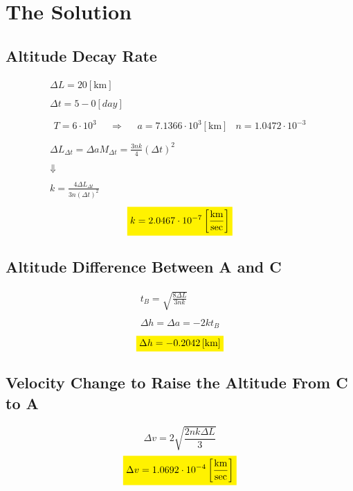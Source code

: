 \documentclass[11pt, a4paper]{article}
\begin{document}
\newpage

\section{The Solution}

\subsection{Altitude Decay Rate}
\begin{equation}
    \begin{array}{c}
        \Delta L=20\left[\mathrm{km}\right] \\\\
        \Delta t=5-0\left[day\right] \\\\
        \begin{matrix}
            T=6\cdot10^3 && \Rightarrow && a=7.1366\cdot10^3\left[\mathrm{km}\right] & n = 1.0472\cdot10^{-3}
        \end{matrix} \\\\
        \Delta L_{\Delta t}=\Delta aM_{\Delta t}=\displaystyle \frac{3nk}{4}\left(\Delta t\right)^2 \\\\
        \Downarrow \\\\
        \displaystyle k = \frac{4\Delta L_{\Delta t}}{3n\left(\Delta t\right)^2}
    \end{array}
\end{equation}
\begin{equation}
    \colorbox{yellow}{$\displaystyle k=2.0467\cdot10^{-7}\left[\frac{\mathrm{km}}{\mathrm{sec}}\right]$}
\end{equation}

\subsection{Altitude Difference Between A and C}
\begin{equation}
    \begin{array}{c}
        \displaystyle t_B=\sqrt{\frac{8\Delta L}{3nk}} \\\\
        \Delta h=\Delta a=-2kt_B
    \end{array}
\end{equation}
\begin{equation}
    \colorbox{yellow}{$\displaystyle \Delta h=-0.2042\left[\mathrm{km}\right]$}
\end{equation}

\subsection{Velocity Change to Raise the Altitude From C to A}
\begin{equation}
    \Delta v=2\sqrt{\frac{2nk\Delta L}{3}}
\end{equation}
\begin{equation}
    \colorbox{yellow}{$\displaystyle \Delta v=1.0692\cdot10^{-4}\left[\frac{\mathrm{km}}{\mathrm{sec}}\right]$}
\end{equation}
\end{document}
